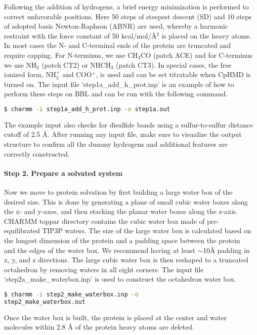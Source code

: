 Following the addition of hydrogens, a brief energy minimization is performed to correct unfavorable positions.
Here 50 steps of steepest descent (SD) and 10 steps of adopted basis Newton-Raphson (ABNR) are used, whereby a harmonic restraint with the force constant of 50 kcal/mol/{\AA}$^2$ is placed on the heavy atoms.
In most cases the N- and C-terminal ends of the protein are truncated and require capping. 
For N-terminus, we use CH$_3$CO (patch ACE) and 
for C-terminus we use NH$_2$ (patch CT2) or NHCH$_3$ (patch CT3).
In special cases, the free ionized form, NH$_{3}^{+}$ and COO$^+$, is used and can be set titratable when CpHMD is turned on. 
The input file `step1a\_add\_h\_prot.inp' is an example of how to perform these steps on BBL and can be run with the following command.
%
\begin{lstlisting}[language=bash]
$ charmm -i step1a_add_h_prot.inp -o step1a.out
\end{lstlisting}
%
The example input also checks for disulfide bonds using a sulfur-to-sulfur distance cutoff of 2.5 {\AA}. 
After running any input file, make sure to visualize the output 
structure to confirm all the dummy hydrogens and additional features are correctly constructed. 

\paragraph{Step 2. Prepare a solvated system}
Now we move to protein solvation by first building a large 
water box of the desired size.
This is done by generating a plane of small cubic water boxes 
along the x- and y-axes, and then stacking the planar water boxes along the z-axis.
CHARMM toppar directory contains the cubic water box made
of pre-equilibrated TIP3P waters.
The size of the large water box is calculated based on the longest
dimension of the protein and a padding space between the protein 
and the edges of the water box.
We recommend having at least $\sim$10{\AA} padding in x, y, and z directions.
The large cubic water box is then reshaped to a truncated octahedron by removing waters in all eight corners. 
The input file `step2a\_make\_waterbox.inp' is used to construct the octahedron water box.
%
\begin{lstlisting}[language=bash]
$ charmm -i step2_make_waterbox.inp -o 
step2_make_waterbox.out
\end{lstlisting}
%
Once the water box is built, the protein is placed at the center and water molecules within 2.8 {\AA} of the protein heavy atoms are deleted.


